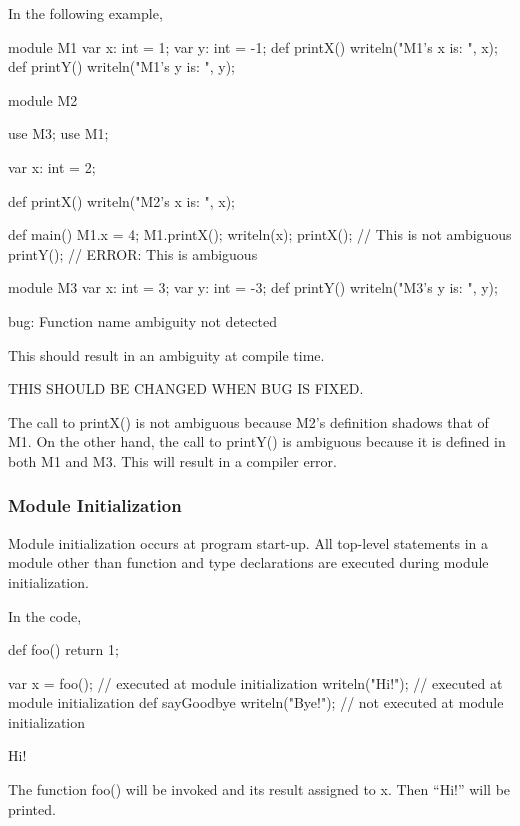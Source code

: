 \begin{example}
%
%
%
In the following example,
\begin{chapelpre}
\end{chapelpre}
\begin{chapel}
module M1 {
  var x: int = 1;
  var y: int = -1;
  def printX() {
    writeln("M1's x is: ", x);
  }
  def printY() {
    writeln("M1's y is: ", y);
  }
}
 
module M2 {
  use M3;
  use M1;

  var x: int = 2;

  def printX() {
    writeln("M2's x is: ", x);
  }

  def main() {
    M1.x = 4;
    M1.printX();
    writeln(x);
    printX(); // This is not ambiguous
    printY(); // ERROR: This is ambiguous
  }
}

module M3 {
  var x: int = 3;
  var y: int = -3;
  def printY() {
    writeln("M3's y is: ", y);
  }
}
\end{chapel}
\begin{chapelfuture}
bug: Function name ambiguity not detected

This should result in an ambiguity at compile time.
\end{chapelfuture}
\begin{chapeloutput}
THIS SHOULD BE CHANGED WHEN BUG IS FIXED.
\end{chapeloutput}
The call to printX() is not ambiguous because M2's definition shadows
that of M1.  On the other hand, the call to printY() is ambiguous
because it is defined in both M1 and M3.  This will result in a
compiler error.


\end{example}


\subsubsection{Module Initialization}
\label{Module_Initialization}

Module initialization occurs at program start-up.  All top-level
statements in a module other than function and type declarations are
executed during module initialization.

\begin{example}
In the code,
\begin{chapelpre}
def foo() {
    return 1;
}
\end{chapelpre}
\begin{chapel}
var x = foo();       // executed at module initialization
writeln("Hi!");      // executed at module initialization
def sayGoodbye {
  writeln("Bye!");   // not executed at module initialization
}
\end{chapel}
\begin{chapeloutput}
Hi!
\end{chapeloutput}
The function foo() will be invoked and its result assigned to x.  Then
``Hi!'' will be printed.
\end{example}

